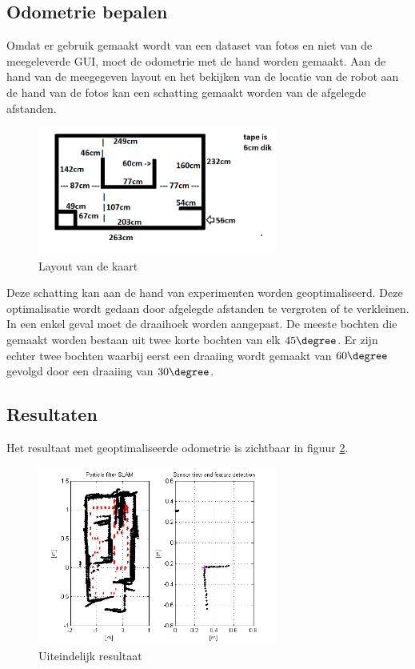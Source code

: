 \documentclass[a4paper]{article}
\begin{document}
\subsection{Odometrie bepalen}
Omdat er gebruik gemaakt wordt van een dataset van fotos en niet van de meegeleverde GUI, moet de odometrie met de hand worden gemaakt. Aan de hand van de meegegeven layout en het bekijken van de locatie van de robot aan de hand van de fotos kan een schatting gemaakt worden van de afgelegde afstanden.
\begin{figure}[h]
	\centering
	\includegraphics[width=0.7\textwidth]{matlab/imgs/layout.png}
	\caption{Layout van de kaart}
	\label{fig:layout}
\end{figure}
Deze schatting kan aan de hand van experimenten worden geoptimaliseerd. Deze optimalisatie wordt gedaan door afgelegde afstanden te vergroten of te verkleinen. In een enkel geval moet de draaihoek worden aangepast. De meeste bochten die gemaakt worden bestaan uit twee korte bochten van elk $45\degree$. Er zijn echter twee bochten waarbij eerst een draaiing wordt gemaakt van $60\degree$ gevolgd door een draaiing van $30\degree$.
\subsection{Resultaten}
Het resultaat met geoptimaliseerde odometrie is zichtbaar in figuur \ref{fig:final}. 
\begin{figure}[h]
	\centering
	\includegraphics[width=0.7\textwidth]{img/statusnow.png}
	\caption{Uiteindelijk resultaat}
	\label{fig:final}
\end{figure}
\end{document}
